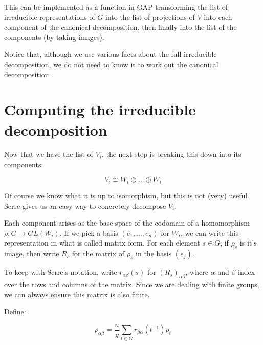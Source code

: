\documentclass{article}
\begin{document}
This can be implemented as a function in GAP transforming the list of
irreducible representations of $G$ into the list of projections of $V$
into each component of the canonical decomposition, then finally into
the list of the components (by taking images).

Notice that, although we use various facts about the full irreducible
decomposition, we do not need to know it to work out the canonical
decomposition.

\section{Computing the irreducible decomposition}

Now that we have the list of $V_i$, the next step is breaking this
down into its components:

$$V_i \cong W_i \oplus \ldots \oplus W_i$$

Of course we know what it is up to isomorphism, but this is not (very)
useful. Serre gives us an easy way to concretely decompose $V_i$.

Each component arises as the base space of the codomain of a
homomorphism $\rho : G \to GL(W_i)$. If we pick a basis $(e_1, \ldots,
e_n)$ for $W_i$, we can write this representation in what is called
matrix form. For each element $s \in G$, if $\rho_s$ is it's image,
then write $R_s$ for the matrix of $\rho_s$ in the basis $(e_j)$.

To keep with Serre's notation, write $r_{\alpha\beta}(s)$ for
$(R_s)_{\alpha\beta}$, where $\alpha$ and $\beta$ index over the rows
and columns of the matrix. Since we are dealing with finite groups, we
can always ensure this matrix is also finite.

Define:

\begin{equation}
p_{\alpha\beta} = \frac{n}{g}\sum_{t \in G} r_{\beta\alpha}(t^{-1})\rho_t \tag{$*$}
\end{equation}
\end{document}
